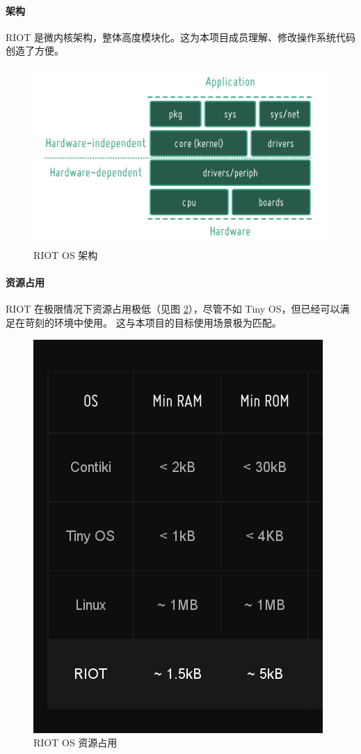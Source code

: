 \documentclass{ctexart}
\begin{document}
\paragraph{架构}
RIOT 是微内核架构，整体高度模块化。这为本项目成员理解、修改操作系统代码创造了方便。

\begin{figure}
	\includegraphics[width=\textwidth]{RIOT-Overview.png}
	\caption{RIOT OS 架构}
	\label{RIOT-Overview}
\end{figure}

\paragraph{资源占用}
RIOT 在极限情况下资源占用极低（见图 \ref{RIOT-Resource}），尽管不如 Tiny OS，但已经可以满足在苛刻的环境中使用。
这与本项目的目标使用场景极为匹配。

\begin{figure}
	\centering
	\includegraphics[scale=0.3]{RIOT-Resource.png}
	\caption{RIOT OS 资源占用}
	\label{RIOT-Resource}
\end{figure}
\end{document}
